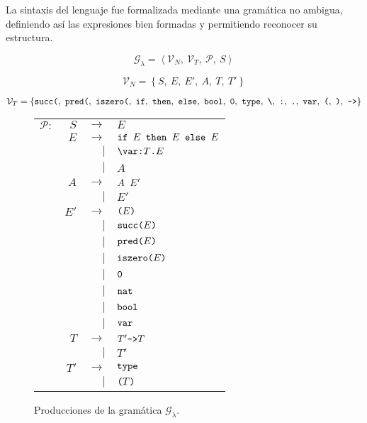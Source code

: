 \documentclass[11pt]{article}
\newcommand\produces{$\rightarrow$ \qquad}
\newcommand\alsoproduces{$\vert$}
\begin{document}
La sintaxis del lenguaje fue formalizada mediante una gramática no ambigua,
definiendo así las expresiones bien formadas y permitiendo reconocer su
estructura.


\[ \mathcal{G}_{\lambda} = \left\langle
	\mathcal{V}_N,\ \mathcal{V}_T,\ \mathcal{P},\ S \right\rangle \]

\[ \mathcal{V}_N = \left\lbrace S,\ E,\ E',\ A,\ T,\ T' \right\rbrace \]

\[ \mathcal{V}_T = \left\lbrace
	\verb|succ(|,\ \verb|pred(|,\ \verb|iszero(|,\ 
	\verb|if|,\ \verb|then|,\ \verb|else|,\ \verb|bool|,\ 
    \verb|0|,\ \verb|type|,\ \verb|\|,\ \verb|:|,\ \verb|.|,\ 
    \verb|var|,\ \verb|(|,\ \verb|)|,\ \verb|->|
    \right\rbrace \]

\begin{figure}[H] \centering
\begin{tabular}{lrrl}
$\mathcal{P}:$
& $S$  & \produces     & $E$ \\
& $E$  & \produces     & $\verb|if | E \verb| then | E \verb| else | E$ \\
&      & \alsoproduces & $\verb|\var:| T \verb|.| E$ \\
&      & \alsoproduces & $A$ \\
& $A$  & \produces     & $A \verb| | E'$ \\
&      & \alsoproduces & $E'$ \\
& $E'$ & \produces     & $\verb|(| E \verb|)|$ \\
&      & \alsoproduces & $\verb|succ(| E \verb|)|$ \\
&      & \alsoproduces & $\verb|pred(| E \verb|)|$ \\
&      & \alsoproduces & $\verb|iszero(| E \verb|)|$ \\
&      & \alsoproduces & $\verb|0|$ \\
&      & \alsoproduces & $\verb|nat|$ \\
&      & \alsoproduces & $\verb|bool|$ \\
&      & \alsoproduces & $\verb|var|$ \\
& $T$  & \produces     & $T' \verb|->| T$ \\
&      & \alsoproduces & $T'$ \\
& $T'$ & \produces     & $\verb|type|$ \\
&      & \alsoproduces & $\verb|(| T \verb|)|$ \\
\end{tabular}
\caption{Producciones de la gramática $\mathcal{G}_{\lambda}$.}
\label{fig:gramatica}
\end{figure}
\end{document}
